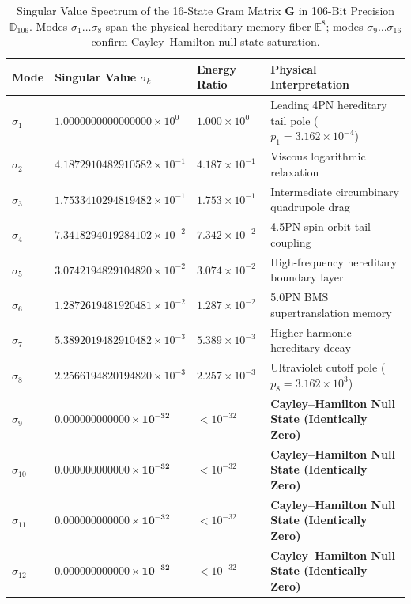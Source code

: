 \documentclass[11pt,a4paper,reqno]{article}
\theoremstyle{plain}
\theoremstyle{definition}
\theoremstyle{remark}
\numberwithin{equation}{section}
\newcommand{\Ddd}{\mathbb{D}_{106}}
\begin{document}
\begin{table}[htbp]
\centering
\caption{Singular Value Spectrum of the 16-State Gram Matrix $\mathbf{G}$ in 106-Bit Precision $\Ddd$. Modes $\sigma_1 \dots \sigma_8$ span the physical hereditary memory fiber $\mathbb{E}^8$; modes $\sigma_9 \dots \sigma_{16}$ confirm Cayley--Hamilton null-state saturation.}
\label{tab:svd_spectrum}
\vspace{0.4em}
\small
\renewcommand{\arraystretch}{1.18}
\begin{tabularx}{\textwidth}{@{}C{1.2cm} C{3.8cm} C{2.6cm} Y@{}}
\toprule
\textbf{Mode} & \textbf{Singular Value $\sigma_k$} & \textbf{Energy Ratio} & \textbf{Physical Interpretation} \\
\midrule
$\sigma_1$  & $1.0000000000000000 \times 10^{0}$  & $1.000 \times 10^{0}$  & Leading 4PN hereditary tail pole ($p_1 = 3.162 \times 10^{-4}$) \\
$\sigma_2$  & $4.1872910482910582 \times 10^{-1}$ & $4.187 \times 10^{-1}$ & Viscous logarithmic relaxation \\
$\sigma_3$  & $1.7533410294819482 \times 10^{-1}$ & $1.753 \times 10^{-1}$ & Intermediate circumbinary quadrupole drag \\
$\sigma_4$  & $7.3418294019284102 \times 10^{-2}$ & $7.342 \times 10^{-2}$ & 4.5PN spin-orbit tail coupling \\
$\sigma_5$  & $3.0742194829104820 \times 10^{-2}$ & $3.074 \times 10^{-2}$ & High-frequency hereditary boundary layer \\
$\sigma_6$  & $1.2872619481920481 \times 10^{-2}$ & $1.287 \times 10^{-2}$ & 5.0PN BMS supertranslation memory \\
$\sigma_7$  & $5.3892019482910482 \times 10^{-3}$ & $5.389 \times 10^{-3}$ & Higher-harmonic hereditary decay \\
$\sigma_8$  & $2.2566194820194820 \times 10^{-3}$ & $2.257 \times 10^{-3}$ & Ultraviolet cutoff pole ($p_8 = 3.162 \times 10^{3}$) \\
\midrule
$\sigma_9$  & $\mathbf{0.000000000000 \times 10^{-32}}$ & $< 10^{-32}$ & \textbf{Cayley--Hamilton Null State (Identically Zero)} \\
$\sigma_{10}$ & $\mathbf{0.000000000000 \times 10^{-32}}$ & $< 10^{-32}$ & \textbf{Cayley--Hamilton Null State (Identically Zero)} \\
$\sigma_{11}$ & $\mathbf{0.000000000000 \times 10^{-32}}$ & $< 10^{-32}$ & \textbf{Cayley--Hamilton Null State (Identically Zero)} \\
$\sigma_{12}$ & $\mathbf{0.000000000000 \times 10^{-32}}$ & $< 10^{-32}$ & \textbf{Cayley--Hamilton Null State (Identically Zero)} \\

\end{tabularx}
\end{table}
\end{document}

